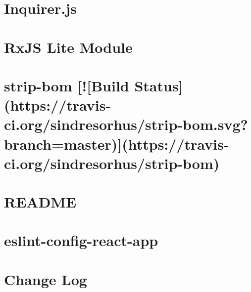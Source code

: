 \documentclass[twoside]{book}
\newcommand{\+}{\discretionary{\mbox{\scriptsize$\hookleftarrow$}}{}{}}
\begin{document}
\chapter{Inquirer.\+js}
\label{md__c_1_workspace_demo_src_main_script_node_modules_eslint_node_modules_inquirer__r_e_a_d_m_e}

\chapter{Rx\+JS Lite Module}
\label{md__c_1_workspace_demo_src_main_script_node_modules_eslint_node_modules_rx-lite_readme}

\chapter{strip-\/bom \mbox{[}!\mbox{[}Build Status\mbox{]}(https\+://travis-\/ci.org/sindresorhus/strip-\/bom.svg?branch=master)\mbox{]}(https\+://travis-\/ci.org/sindresorhus/strip-\/bom)}
\label{md__c_1_workspace_demo_src_main_script_node_modules_eslint_node_modules_strip-bom_readme}

\chapter{R\+E\+A\+D\+ME}
\label{md__c_1_workspace_demo_src_main_script_node_modules_eslint__r_e_a_d_m_e}

\chapter{eslint-\/config-\/react-\/app}
\label{md__c_1_workspace_demo_src_main_script_node_modules_eslint-config-react-app__r_e_a_d_m_e}

\chapter{Change Log}
\label{md__c_1_workspace_demo_src_main_script_node_modules_eslint-import-resolver-node__c_h_a_n_g_e_l_o_g}

\end{document}
